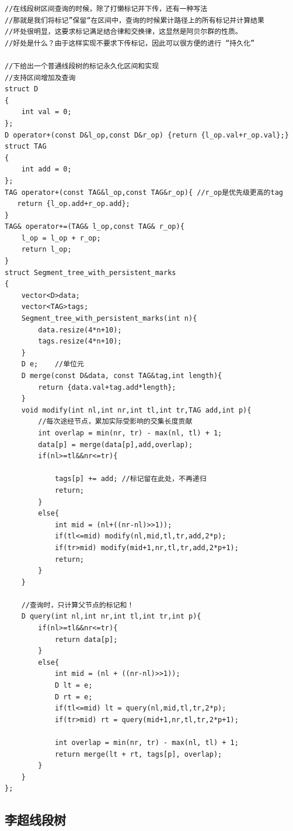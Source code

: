 \begin{lstlisting}
//在线段树区间查询的时候，除了打懒标记并下传，还有一种写法
//那就是我们将标记”保留“在区间中，查询的时候累计路径上的所有标记并计算结果
//坏处很明显，这要求标记满足结合律和交换律，这显然是阿贝尔群的性质。
//好处是什么？由于这样实现不要求下传标记，因此可以很方便的进行 “持久化”

//下给出一个普通线段树的标记永久化区间和实现
//支持区间增加及查询
struct D
{
    int val = 0;
};
D operator+(const D&l_op,const D&r_op) {return {l_op.val+r_op.val};}
struct TAG
{
    int add = 0;
};
TAG operator+(const TAG&l_op,const TAG&r_op){ //r_op是优先级更高的tag
   return {l_op.add+r_op.add};
}
TAG& operator+=(TAG& l_op,const TAG& r_op){
    l_op = l_op + r_op;
    return l_op;
}
struct Segment_tree_with_persistent_marks
{
    vector<D>data;
    vector<TAG>tags;
    Segment_tree_with_persistent_marks(int n){
        data.resize(4*n+10);
        tags.resize(4*n+10);
    }
    D e;    //单位元
    D merge(const D&data, const TAG&tag,int length){
        return {data.val+tag.add*length};
    }
    void modify(int nl,int nr,int tl,int tr,TAG add,int p){
        //每次途经节点，累加实际受影响的交集长度贡献
        int overlap = min(nr, tr) - max(nl, tl) + 1;
        data[p] = merge(data[p],add,overlap); 
        if(nl>=tl&&nr<=tr){
            
            tags[p] += add; //标记留在此处，不再递归
            return;
        }
        else{
            int mid = (nl+((nr-nl)>>1));
            if(tl<=mid) modify(nl,mid,tl,tr,add,2*p);
            if(tr>mid) modify(mid+1,nr,tl,tr,add,2*p+1);
            return;
        }
    }

    //查询时，只计算父节点的标记和！
    D query(int nl,int nr,int tl,int tr,int p){
        if(nl>=tl&&nr<=tr){
            return data[p];
        }
        else{
            int mid = (nl + ((nr-nl)>>1));
            D lt = e;
            D rt = e;
            if(tl<=mid) lt = query(nl,mid,tl,tr,2*p);
            if(tr>mid) rt = query(mid+1,nr,tl,tr,2*p+1);

            int overlap = min(nr, tr) - max(nl, tl) + 1;
            return merge(lt + rt, tags[p], overlap);
        }
    }
};
\end{lstlisting}

\subsection{李超线段树}

